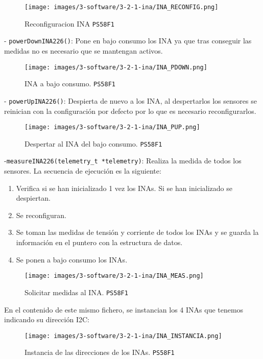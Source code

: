 \begin{figure}[H]
    \centering
    \texttt{[image: images/3-software/3-2-1-ina/INA\_RECONFIG.png]}
    \caption{Reconfiguracion INA \texttt{PS58F1}}
    \label{fig:software/INA/INA_RECONFIG}
\end{figure}

- \texttt{powerDownINA226()}: Pone en bajo consumo los INA ya que tras conseguir las medidas no es necesario que se mantengan activos.

\begin{figure}[H]
    \centering
    \texttt{[image: images/3-software/3-2-1-ina/INA\_PDOWN.png]}
    \caption{INA a bajo consumo. \texttt{PS58F1}}
    \label{fig:software/INA/INA_PDOWN}
\end{figure}

- \texttt{powerUpINA226()}: Despierta de nuevo a los INA, al despertarlos los sensores se reinician con la configuración por defecto por lo que es necesario reconfigurarlos.

\begin{figure}[H]
    \centering
    \texttt{[image: images/3-software/3-2-1-ina/INA\_PUP.png]}
    \caption{Despertar al INA del bajo consumo. \texttt{PS58F1}}
    \label{fig:software/INA/INA_PUP}
\end{figure}


-\texttt{measureINA226(telemetry\_t *telemetry)}: Realiza la medida de todos los sensores. La secuencia de ejecución es la siguiente:

\begin{enumerate}
    \item Verifica si se han inicializado 1 vez los INAs. Si se han inicializado se despiertan.
    \item Se reconfiguran.
    \item Se toman las medidas de tensión y corriente de todos los INAs y se guarda la información en el puntero con la estructura de datos.
    \item Se ponen a bajo consumo los INAs.
\end{enumerate}

\begin{figure}[H]
    \centering
    \texttt{[image: images/3-software/3-2-1-ina/INA\_MEAS.png]}
    \caption{Solicitar medidas al INA. \texttt{PS58F1}}
    \label{fig:software/INA/INA_MEAS}
\end{figure}


En el contenido de este mismo fichero, se instancian los 4 INAs que tenemos indicando su dirección I2C:

\begin{figure}[H]
    \centering
    \texttt{[image: images/3-software/3-2-1-ina/INA\_INSTANCIA.png]}
    \caption{Instancia de las direcciones de los INAs. \texttt{PS58F1}}
    \label{fig:software/INA/INA_INSTANCIA}
\end{figure}

